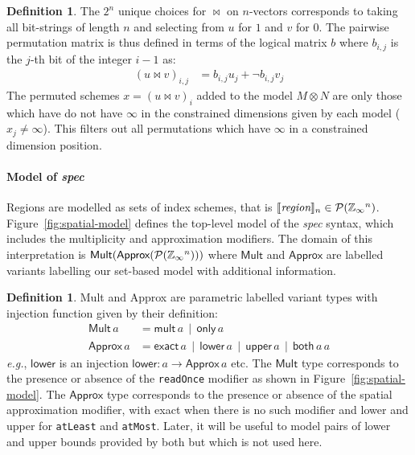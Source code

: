 \documentclass[10pt,preprint]{sigplanconf}
\newcounter{block}
\theoremstyle{definition}
\newtheorem{definition}[block]{Definition}
\newcommand{\eg}{\emph{e.g.}}
\newcommand{\interp}[1]{\llbracket{#1}\rrbracket}
\newcommand{\term}[1]{\texttt{#1}}
\begin{document}
\begin{definition}
%
The $2^n$ unique choices for $\bowtie$ on $n$-vectors
corresponds to taking all bit-strings of length $n$ and
selecting from $u$ for $1$ and $v$ for $0$. The pairwise permutation
matrix is thus defined in terms of the logical
matrix $b$ where $b_{i,j}$ is the $j$-th bit of the integer
$i - 1$ as:
%
\begin{align*}
(u \bowtie v)_{i,j} & = b_{i,j} u_j + \neg b_{i,j} v_j
\end{align*}
%
The permuted schemes $x = (u \bowtie v)_i$ added to the model
$M \otimes N$ are only those which have do not have $\infty$ in
the constrained dimensions given by each model ($x_j \neq
\infty$). This filters out all permutations which have
$\infty$ in a constrained dimension position.
\end{definition}

\paragraph{Model of \textit{spec}}

Regions are modelled as sets of index
schemes, that is
$\interp{\textit{region}}_n \in \mathcal{P}(\domainVal{}^n)$.
Figure~\ref{fig:spatial-model} defines the top-level model of the
\textit{spec} syntax, which includes the multiplicity and
approximation modifiers. The domain of this interpretation
is $\textsf{Mult}(\textsf{Approx}(\mathcal{P}(\mathbb{Z}_\infty{}^n)))$
where $\textsf{Mult}$ and $\textsf{Approx}$ are labelled variants
labelling our set-based model with additional information.

\begin{definition} \textsf{Mult}
and \textsf{Approx} are parametric labelled variant types
with injection function given by their definition:
%
\begin{align*}
\textsf{Mult} \, a & = \textsf{mult} \, a \,\mid\, \textsf{only} \, a \\
\textsf{Approx} \, a & = \textsf{exact} \, a \,\mid\, \textsf{lower} \, a \,\mid\,
\textsf{upper} \, a \,\mid\, \textsf{both} \, a \, a
\end{align*}
\eg{}, $\mathsf{lower}$ is an injection
$\mathsf{lower} : a \rightarrow \mathsf{Approx} \, a$ etc. The
$\textsf{Mult}$ type corresponds to the presence or absence of the
\term{readOnce} modifier as shown in Figure~\ref{fig:spatial-model}.
The $\textsf{Approx}$ type corresponds to the presence or absence of
the spatial approximation modifier, with \textsf{exact} when there is
no such modifier and \textsf{lower} and \textsf{upper} for
\term{atLeast} and \term{atMost}. Later, it will be useful to model
pairs of lower and upper bounds provided by \textsf{both} but which is
not used
here.%
\label{def:mult-and-approx}
\end{definition}
\end{document}
